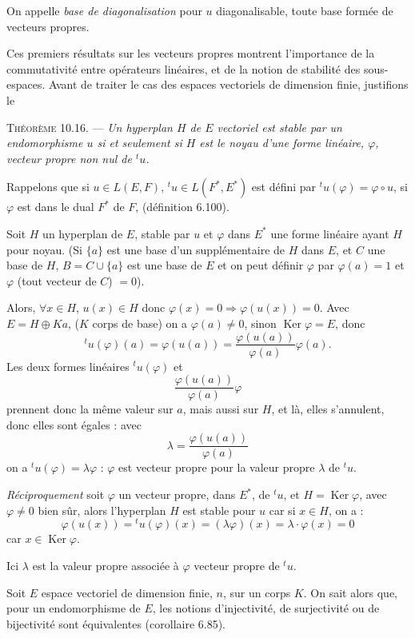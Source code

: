 On appelle \emph{base de diagonalisation} pour $u$ diagonalisable, toute base formée de vecteurs propres.

Ces premiers résultats sur les vecteurs propres montrent l'importance de la commutativité entre opérateurs linéaires, et de la notion de stabilité des sous-espaces. Avant de traiter le cas des espaces vectoriels de dimension finie, justifions le

\medskip\noindent\textsc{Théorème 10.16.} --- \emph{Un hyperplan $H$ de $E$ vectoriel est stable par un endomorphisme $u$ si et seulement si $H$ est le noyau d'une forme linéaire, $\varphi$, vecteur propre non nul de ${}^tu$.}

Rappelons que si $u\in L(E,F)$, ${}^tu\in L(F^*,E^*)$ est défini par ${}^tu(\varphi)=\varphi\circ u$, si $\varphi$ est dans le dual $F^*$ de $F$, (définition 6.100).

Soit $H$ un hyperplan de $E$, stable par $u$ et $\varphi$ dans $E^*$ une forme linéaire ayant $H$ pour noyau. (Si $\{a\}$ est une base d'un supplémentaire de $H$ dans $E$, et $C$ une base de $H$, $B=C\cup\{a\}$ est une base de $E$ et on peut définir $\varphi$ par $\varphi(a)=1$ et $\varphi$ (tout vecteur de $C$) $=0$).

Alors, $\forall x\in H$, $u(x)\in H$ donc $\varphi(x)=0\Rightarrow\varphi(u(x))=0$. Avec $E=H\oplus K a$, ($K$ corps de base) on a $\varphi(a)\ne0$, sinon $\operatorname{Ker}\varphi=E$, donc
\[
{}^tu(\varphi)(a)=\varphi(u(a))=\frac{\varphi(u(a))}{\varphi(a)}\varphi(a).
\]
Les deux formes linéaires ${}^tu(\varphi)$ et
\[
\frac{\varphi(u(a))}{\varphi(a)}\varphi
\]
prennent donc la même valeur sur $a$, mais aussi sur $H$, et là, elles s'annulent, donc elles sont égales : avec
\[
\lambda=\frac{\varphi(u(a))}{\varphi(a)}
\]
on a ${}^tu(\varphi)=\lambda\varphi$ : $\varphi$ est vecteur propre pour la valeur propre $\lambda$ de ${}^tu$.

\emph{Réciproquement} soit $\varphi$ un vecteur propre, dans $E^*$, de ${}^tu$, et $H=\operatorname{Ker}\varphi$, avec $\varphi\ne0$ bien sûr, alors l'hyperplan $H$ est stable pour $u$ car si $x\in H$, on a :
\[
\varphi(u(x))={}^tu(\varphi)(x)=(\lambda\varphi)(x)=\lambda\cdot\varphi(x)=0
\]
car $x\in\operatorname{Ker}\varphi$.

Ici $\lambda$ est la valeur propre associée à $\varphi$ vecteur propre de ${}^tu$. \bookend


Soit $E$ espace vectoriel de dimension finie, $n$, sur un corps $K$. On sait alors que, pour un endomorphisme de $E$, les notions d'injectivité, de surjectivité ou de bijectivité sont équivalentes (corollaire 6.85).

